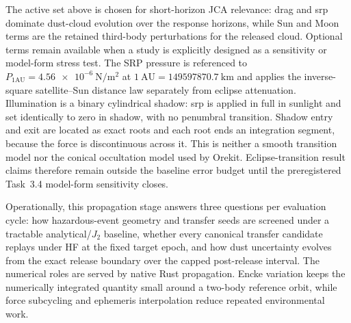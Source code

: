         The active set above is chosen for short-horizon JCA relevance: drag and \gls{srp} dominate dust-cloud evolution over the response horizons, while Sun and Moon terms are the retained third-body perturbations for the released cloud. Optional terms remain available when a study is explicitly designed as a sensitivity or model-form stress test. The SRP pressure is referenced to \(P_{1\mathrm{AU}}=\SI{4.56e-6}{\newton\per\metre\squared}\) at \(1~\mathrm{AU}=\SI{149597870.7}{\kilo\metre}\) and applies the inverse-square satellite--Sun distance law separately from eclipse attenuation. Illumination is a binary cylindrical shadow: \gls{srp} is applied in full in sunlight and set identically to zero in shadow, with no penumbral transition. Shadow entry and exit are located as exact roots and each root ends an integration segment, because the force is discontinuous across it. This is neither a smooth transition model nor the conical occultation model used by Orekit. Eclipse-transition result claims therefore remain outside the baseline error budget until the preregistered Task~3.4 model-form sensitivity closes.

        Operationally, this propagation stage answers three questions per evaluation cycle: how hazardous-event geometry and transfer seeds are screened under a tractable analytical/\(J_2\) baseline, whether every canonical transfer candidate replays under HF at the fixed target epoch, and how dust uncertainty evolves from the exact release boundary over the capped post-release interval. The numerical roles are served by native Rust propagation. Encke variation keeps the numerically integrated quantity small around a two-body reference orbit, while force subcycling and ephemeris interpolation reduce repeated environmental work.

